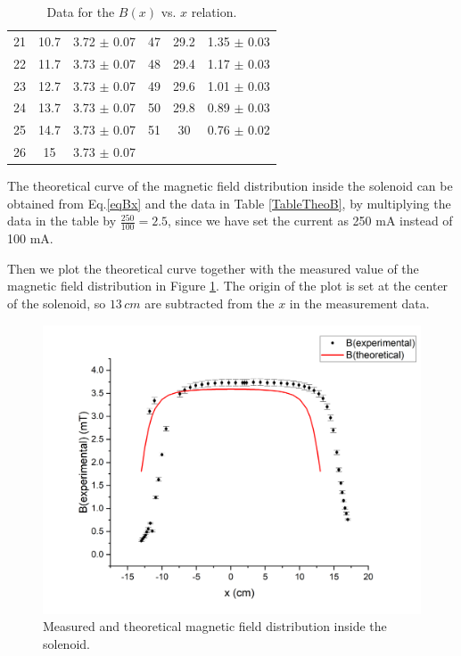 \documentclass{article}
\begin{document}
\begin{table}[htbp]
\begin{tabular}{ccc||ccc}
    21    & 10.7  & 3.72 $\pm$ 0.07 & 47    & 29.2  & 1.35 $\pm$ 0.03 \\
    22    & 11.7  & 3.73 $\pm$ 0.07 & 48    & 29.4  & 1.17 $\pm$ 0.03 \\
    23    & 12.7  & 3.73 $\pm$ 0.07 & 49    & 29.6  & 1.01 $\pm$ 0.03 \\
    24    & 13.7  & 3.73 $\pm$ 0.07 & 50    & 29.8  & 0.89 $\pm$ 0.03 \\
    25    & 14.7  & 3.73 $\pm$ 0.07 & 51    & 30    & 0.76 $\pm$ 0.02 \\
    26    & 15    & 3.73 $\pm$ 0.07 \\
\bottomrule
\end{tabular}
\caption{Data for the $B(x)$ vs. $x$ relation.}\label{TableBx}
\end{table}

The theoretical curve of the magnetic field distribution inside the solenoid can be obtained from Eq.\eqref{eqBx} and the data in Table \ref{TableTheoB}, by multiplying the data in the table by $\frac{250}{100} = 2.5$, since we have set the current as 250 mA instead of 100 mA.

Then we plot the theoretical curve together with the measured value of the magnetic field distribution in Figure \ref{FigB}. The origin of the plot is set at the center of the solenoid, so $13\,cm$ are subtracted from the $x$ in the measurement data.

\begin{figure}[H]\centering
\includegraphics[scale=0.4]{plot3.png}
\caption{Measured and theoretical magnetic field distribution inside the solenoid.}\label{FigB}
\end{figure}
\end{document}
